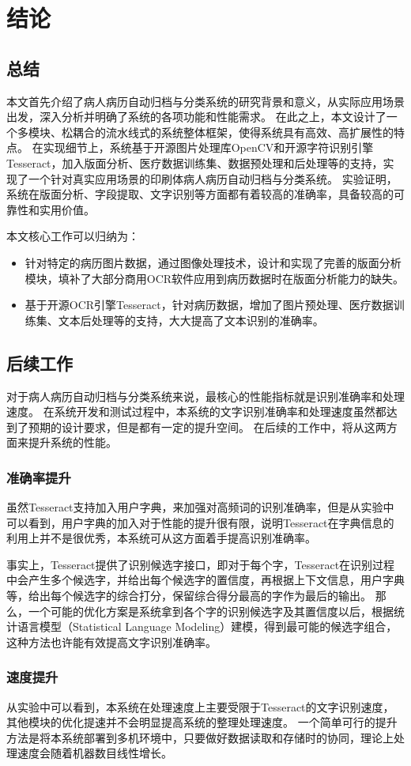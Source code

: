 \chapter{结论}
\label{chap:conclusion}
\section*{总结}
本文首先介绍了病人病历自动归档与分类系统的研究背景和意义，从实际应用场景出发，深入分析并明确了系统的各项功能和性能需求。
在此之上，本文设计了一个多模块、松耦合的流水线式的系统整体框架，使得系统具有高效、高扩展性的特点。
在实现细节上，系统基于开源图片处理库OpenCV和开源字符识别引擎Tesseract，加入版面分析、医疗数据训练集、数据预处理和后处理等的支持，实现了一个针对真实应用场景的印刷体病人病历自动归档与分类系统。
实验证明，系统在版面分析、字段提取、文字识别等方面都有着较高的准确率，具备较高的可靠性和实用价值。

本文核心工作可以归纳为：
\begin{itemize}
  \item 针对特定的病历图片数据，通过图像处理技术，设计和实现了完善的版面分析模块，填补了大部分商用OCR软件应用到病历数据时在版面分析能力的缺失。
  \item 基于开源OCR引擎Tesseract，针对病历数据，增加了图片预处理、医疗数据训练集、文本后处理等的支持，大大提高了文本识别的准确率。
\end{itemize}

\section*{后续工作}
对于病人病历自动归档与分类系统来说，最核心的性能指标就是识别准确率和处理速度。
在系统开发和测试过程中，本系统的文字识别准确率和处理速度虽然都达到了预期的设计要求，但是都有一定的提升空间。
在后续的工作中，将从这两方面来提升系统的性能。
\subsection*{准确率提升}
虽然Tesseract支持加入用户字典，来加强对高频词的识别准确率，但是从实验中可以看到，用户字典的加入对于性能的提升很有限，说明Tesseract在字典信息的利用上并不是很优秀，本系统可从这方面着手提高识别准确率。

事实上，Tesseract提供了识别候选字接口，即对于每个字，Tesseract在识别过程中会产生多个候选字，并给出每个候选字的置信度，再根据上下文信息，用户字典等，给出每个候选字的综合打分，保留综合得分最高的字作为最后的输出。
那么，一个可能的优化方案是系统拿到各个字的识别候选字及其置信度以后，根据统计语言模型（Statistical Language Modeling）\citep{brown1990statistical}建模，得到最可能的候选字组合，这种方法也许能有效提高文字识别准确率。
\subsection*{速度提升}
从实验中可以看到，本系统在处理速度上主要受限于Tesseract的文字识别速度，其他模块的优化提速并不会明显提高系统的整理处理速度。
一个简单可行的提升方法是将本系统部署到多机环境中，只要做好数据读取和存储时的协同，理论上处理速度会随着机器数目线性增长。
